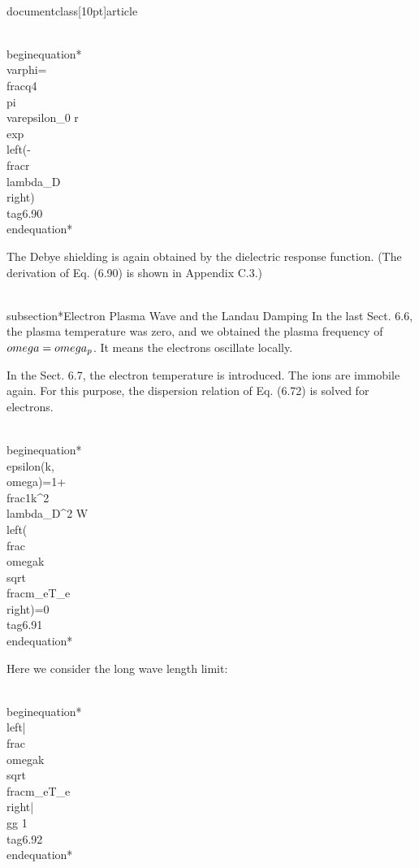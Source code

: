 \\documentclass[10pt]{article}
\begin{document}
{{{{\\begin{equation*}
\\varphi=\\frac{q}{4 \\pi \\varepsilon_{0} r} \\exp \\left(-\\frac{r}{\\lambda_{D}}\\right) \\tag{6.90}
\\end{equation*}


The Debye shielding is again obtained by the dielectric response function. (The derivation of Eq. (6.90) is shown in Appendix C.3.)

\\subsection*{Electron Plasma Wave and the Landau Damping}
In the last Sect. 6.6, the plasma temperature was zero, and we obtained the plasma frequency of $\\omega=\\omega_{p}$. It means the electrons oscillate locally.

In the Sect. 6.7, the electron temperature is introduced. The ions are immobile again. For this purpose, the dispersion relation of Eq. (6.72) is solved for electrons.


\\begin{equation*}
\\epsilon(k, \\omega)=1+\\frac{1}{k^{2} \\lambda_{D}^{2}} W\\left(\\frac{\\omega}{k} \\sqrt{\\frac{m_{e}}{T_{e}}}\\right)=0 \\tag{6.91}
\\end{equation*}


Here we consider the long wave length limit:


\\begin{equation*}
\\left|\\frac{\\omega}{k} \\sqrt{\\frac{m_{e}}{T_{e}}}\\right| \\gg 1 \\tag{6.92}
\\end{equation*}


}}}}
\end{document}
